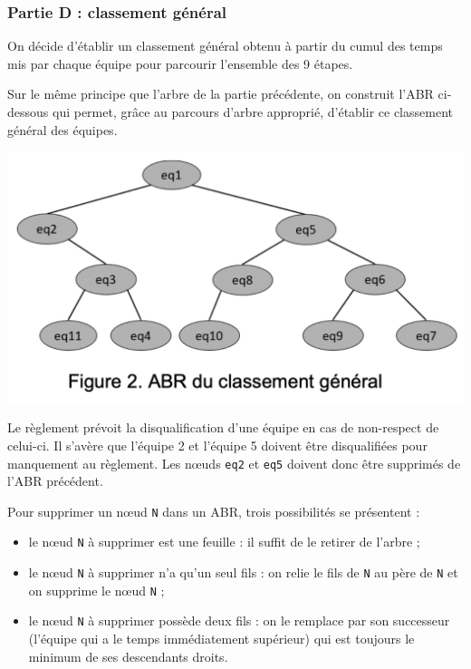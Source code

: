 \documentclass[
  paper=a4,
  ,captions=tableheading
]{scrartcl}
\providecommand{\tightlist}{%
  \setlength{\itemsep}{0pt}\setlength{\parskip}{0pt}}
\begin{document}
\subsubsection{Partie D : classement
général}\label{partie-d-classement-guxe9nuxe9ral}

On décide d'établir un classement général obtenu à partir du cumul des
temps mis par chaque équipe pour parcourir l'ensemble des 9 étapes.

Sur le même principe que l'arbre de la partie précédente, on construit
l'ABR ci-dessous qui permet, grâce au parcours d'arbre approprié,
d'établir ce classement général des équipes.

\includegraphics{24-NSIJ1ME1-Ex3-04.png}

Le règlement prévoit la disqualification d'une équipe en cas de
non-respect de celui-ci. Il s'avère que l'équipe 2 et l'équipe 5 doivent
être disqualifiées pour manquement au règlement. Les nœuds \texttt{eq2}
et \texttt{eq5} doivent donc être supprimés de l'ABR précédent.

Pour supprimer un nœud \texttt{N} dans un ABR, trois possibilités se
présentent :

\begin{itemize}
\tightlist
\item
  le nœud \texttt{N} à supprimer est une feuille : il suffit de le
  retirer de l'arbre ;
\item
  le nœud \texttt{N} à supprimer n'a qu'un seul fils : on relie le fils
  de \texttt{N} au père de \texttt{N} et on supprime le nœud \texttt{N}
  ;
\item
  le nœud \texttt{N} à supprimer possède deux fils : on le remplace par
  son successeur (l'équipe qui a le temps immédiatement supérieur) qui
  est toujours le minimum de ses descendants droits.
\end{itemize}
\end{document}
